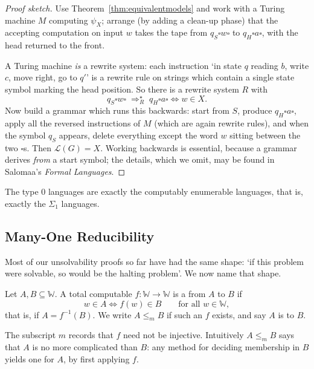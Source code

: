 \documentclass[a4paper]{scrartcl}
\newcommand{\WW}{\mathbb{W}}
\newcommand{\lang}{\mathcal{L}}
\begin{document}
\begin{proof}[Proof sketch]
	Use Theorem~\ref{thm:equivalentmodels} and work with a Turing machine $M$ computing $\psi_X$; arrange (by adding a clean-up phase) that the accepting computation on input $w$ takes the tape from $q_S\bm\square w\bm\square$ to $q_H\bm\square a\bm\square$, with the head returned to the front.

	A Turing machine \emph{is} a rewrite system: each instruction `in state $q$ reading $b$, write $c$, move right, go to $q'$' is a rewrite rule on strings which contain a single state symbol marking the head position. So there is a rewrite system $R$ with
	$$q_S\bm\square w\bm\square \;\Rightarrow_R^\star\; q_H\bm\square a\bm\square \iff w \in X.$$
	Now build a grammar which runs this backwards: start from $S$, produce $q_H \bm\square a \bm\square$, apply all the reversed instructions of $M$ (which are again rewrite rules), and when the symbol $q_S$ appears, delete everything except the word $w$ sitting between the two $\bm\square$s. Then $\lang(G) = X$. Working backwards is essential, because a grammar derives \emph{from} a start symbol; the details, which we omit, may be found in Salomaa's \emph{Formal Languages}.
\end{proof}

\begin{corollary}
	The type $0$ languages are exactly the computably enumerable languages, that is, exactly the $\Sigma_1$ languages.
\end{corollary}

\subsection{Many-One Reducibility}

Most of our unsolvability proofs so far have had the same shape: `if this problem were solvable, so would be the halting problem'. We now name that shape.

\begin{definition}[Reduction]
	Let $A, B \subseteq \WW$. A total computable $f \colon \WW\to\WW$ is a  from $A$ to $B$ if
	$$w \in A \iff f(w) \in B \qquad \text{for all } w \in \WW,$$
	that is, if $A = f^{-1}(B)$. We write $A \leq_m B$ if such an $f$ exists, and say $A$ is  to $B$.
\end{definition}

The subscript $m$ records that $f$ need not be injective. Intuitively $A \leq_m B$ says that $A$ is no more complicated than $B$: any method for deciding membership in $B$ yields one for $A$, by first applying $f$.
\end{document}
